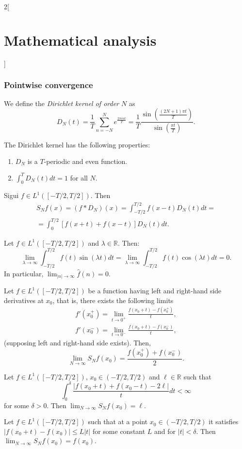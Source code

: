 \documentclass[class=article,crop=false]{standalone}
\begin{document}
\begin{multicols}{2}[\section{Mathematical analysis}]
\subsubsection*{Pointwise convergence}
\begin{definition}
We define the \textit{Dirichlet kernel of order $N$} as $$D_N(t)=\frac{1}{T}\sum_{n=-N}^Ne^{\frac{2\pi int}{T}}=\frac{1}{T}\frac{\sin\left(\frac{(2N+1)\pi t}{T}\right)}{\sin\left(\frac{\pi t}{T}\right)}.$$
\end{definition}
\begin{prop}
The Dirichlet kernel has the following properties:
\begin{enumerate}
    \item $D_N$ is a $T$-periodic and even function.
    \item $\displaystyle\int_0^TD_N(t)dt=1$ for all $N$.
\end{enumerate}
\end{prop}
\begin{prop}
Sigui $f\in L^1([-T/2,T/2])$. Then \begin{multline*}
    S_Nf(x)=(f*D_N)(x)=\int_{-T/2}^{T/2}f(x-t)D_N(t)dt=\\=\int_0^{T/2}[f(x+t)+f(x-t)]D_N(t)dt.
\end{multline*}
\end{prop}
\begin{lemma}
Let $f\in L^1([-T/2,T/2])$ and $\lambda\in\mathbb{R}$. Then: $$\lim_{\lambda\to\infty}\int_{-T/2}^{T/2}f(t)\sin(\lambda t)dt=\lim_{\lambda\to\infty}\int_{-T/2}^{T/2}f(t)\cos(\lambda t)dt=0.$$ In particular, $\displaystyle\lim_{|n|\to\infty}\widehat{f}(n)=0$.
\end{lemma}
\begin{theorem}
Let $f\in L^1([-T/2,T/2])$ be a function having left and right-hand side derivatives at $x_0$, that is, there exists the following limits
\begin{gather*}f'(x_0^+)=\lim_{t\to0^+}\frac{f(x_0+t)-f(x_0^+)}{t},\\ f'(x_0^-)=\lim_{t\to0^-}\frac{f(x_0+t)-f(x_0^-)}{t},\end{gather*}(supposing left and right-hand side exists). Then, $$\lim_{N\to\infty}S_Nf(x_0)=\frac{f(x_0^+)+f(x_0^-)}{2}.$$
\end{theorem}
\begin{theorem}
Let $f\in L^1([-T/2,T/2])$, $x_0\in (-T/2,T/2)$ and $\ell\in\mathbb{R}$ such that $$\int_0^\delta\frac{|f(x_0+t)+f(x_0-t)-2\ell|}{t}dt<\infty$$ for some $\delta>0$. Then $\displaystyle\lim_{N\to\infty}S_Nf(x_0)=\ell$.
\end{theorem}
\begin{theorem}
Let $f\in L^1([-T/2,T/2])$ such that at a point $x_0\in (-T/2,T/2)$ it satisfies $|f(x_0+t)-f(x_0)|\leq L|t|$ for some constant $L$ and for $|t|<\delta$. Then $\displaystyle\lim_{N\to\infty}S_Nf(x_0)=f(x_0)$.
\end{theorem}

\end{multicols}
\end{document}

